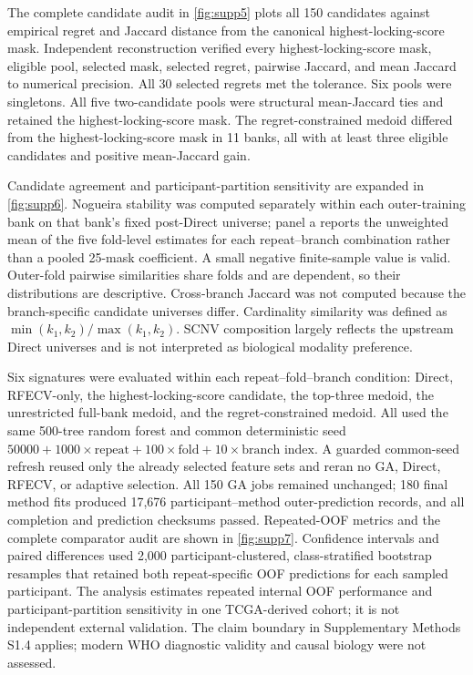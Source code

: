 The complete candidate audit in \cref{fig:supp5} plots all 150 candidates against empirical regret and Jaccard distance from the canonical highest-locking-score mask. Independent reconstruction verified every highest-locking-score mask, eligible pool, selected mask, selected regret, pairwise Jaccard, and mean Jaccard to numerical precision. All 30 selected regrets met the tolerance. Six pools were singletons. All five two-candidate pools were structural mean-Jaccard ties and retained the highest-locking-score mask. The regret-constrained medoid differed from the highest-locking-score mask in 11 banks, all with at least three eligible candidates and positive mean-Jaccard gain.

Candidate agreement and participant-partition sensitivity are expanded in \cref{fig:supp6}. Nogueira stability was computed separately within each outer-training bank on that bank's fixed post-Direct universe; panel a reports the unweighted mean of the five fold-level estimates for each repeat--branch combination rather than a pooled 25-mask coefficient. A small negative finite-sample value is valid. Outer-fold pairwise similarities share folds and are dependent, so their distributions are descriptive. Cross-branch Jaccard was not computed because the branch-specific candidate universes differ. Cardinality similarity was defined as \(\min(k_1,k_2)/\max(k_1,k_2)\). SCNV composition largely reflects the upstream Direct universes and is not interpreted as biological modality preference.

Six signatures were evaluated within each repeat--fold--branch condition: Direct, RFECV-only, the highest-locking-score candidate, the top-three medoid, the unrestricted full-bank medoid, and the regret-constrained medoid. All used the same 500-tree random forest and common deterministic seed \(50000 + 1000\times\text{repeat} + 100\times\text{fold} + 10\times\text{branch index}\). A guarded common-seed refresh reused only the already selected feature sets and reran no GA, Direct, RFECV, or adaptive selection. All 150 GA jobs remained unchanged; 180 final method fits produced 17,676 participant--method outer-prediction records, and all completion and prediction checksums passed. Repeated-OOF metrics and the complete comparator audit are shown in \cref{fig:supp7}. Confidence intervals and paired differences used 2,000 participant-clustered, class-stratified bootstrap resamples that retained both repeat-specific OOF predictions for each sampled participant. The analysis estimates repeated internal OOF performance and participant-partition sensitivity in one TCGA-derived cohort; it is not independent external validation. The claim boundary in Supplementary Methods S1.4 applies; modern WHO diagnostic validity and causal biology were not assessed.

